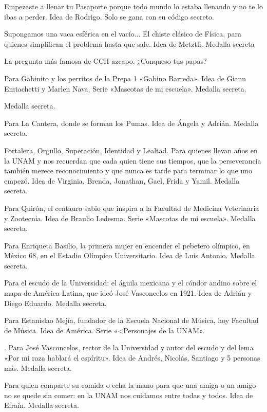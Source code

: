 \begin{description}[leftmargin=1.4cm, style=nextline]
  \item[F0M0PUMA] Empezaste a llenar tu Pasaporte porque todo mundo lo estaba llenando y no te lo ibas a perder. Idea de Rodrigo. Solo se gana con su código secreto.
  \item[V4C4ESF3R4] Supongamos una vaca esférica en el vacío... El chiste clásico de Física, para quienes simplifican el problema hasta que sale. Idea de Metztli. Medalla secreta
  \item[C0NQU3S0] La pregunta más famosa de CCH azcapo. ¿Conqueso tus papas?
  \item[G4B1N1T0] Para Gabinito y los perritos de la Prepa 1 «Gabino Barreda». Idea de Giann Enriachetti y Marlen Nava. Serie «Mascotas de mi escuela». Medalla secreta.
  \item[N0SIST3MA] Medalla secreta.
  \item[C4NT3R4] Para La Cantera, donde se forman los Pumas. Idea de Ángela y Adrián. Medalla secreta.
  \item[F0S1L] Fortaleza, Orgullo, Superación, Identidad y Lealtad. Para quienes llevan años en la UNAM y nos recuerdan que cada quien tiene sus tiempos, que la perseverancia también merece reconocimiento y que nunca es tarde para terminar lo que uno empezó. Idea de Virginia, Brenda, Jonathan, Gael, Frida y Yamil. Medalla secreta.
  \item[QU1R0N] Para Quirón, el centauro sabio que inspira a la Facultad de Medicina Veterinaria y Zootecnia. Idea de Braulio Ledesma. Serie «Mascotas de mi escuela». Medalla secreta.
  \item[3NR1QU3T4] Para Enriqueta Basilio, la primera mujer en encender el pebetero olímpico, en México 68, en el Estadio Olímpico Universitario. Idea de Luis Antonio. Medalla secreta.
  \item[3SCUD0] Para el escudo de la Universidad: el águila mexicana y el cóndor andino sobre el mapa de América Latina, que ideó José Vasconcelos en 1921. Idea de Adrián y Diego Eduardo. Medalla secreta.
  \item[M3J14] Para Estanislao Mejía, fundador de la Escuela Nacional de Música, hoy Facultad de Música. Idea de América. Serie «<Personajes de la UNAM».
  \item[J0S3V4SC] . Para José Vasconcelos, rector de la Universidad y autor del escudo y del lema «Por mi raza hablará el espíritu». Idea de Andrés, Nicolás, Santiago y 5 personas más. Medalla secreta.
  \item[HOYPORT1] Para quien comparte su comida o echa la mano para que una amiga o un amigo no se quede sin comer: en la UNAM nos cuidamos entre todas y todos. Idea de Efraín. Medalla secreta.

\end{description}

